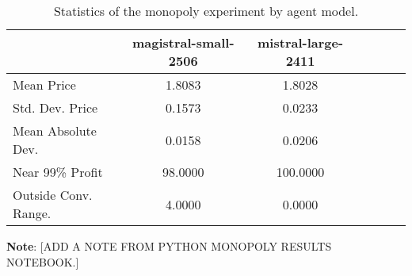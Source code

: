 \begin{table}[H]
\caption{Statistics of the monopoly experiment by agent model.}
\label{tab:monopoly_stats}
\begin{tabular}{lcccccc}
\toprule
 & magistral-small-2506 & mistral-large-2411 \\
\midrule
Mean Price & 1.8083 & 1.8028 \\
Std. Dev. Price & 0.1573 & 0.0233 \\
Mean Absolute Dev. & 0.0158 & 0.0206 \\
Near 99\% Profit & 98.0000 & 100.0000 \\
Outside Conv. Range. & 4.0000 & 0.0000 \\
\bottomrule
\end{tabular}
\vspace{0.5em}
\footnotesize{\parbox{1\textwidth}{\textbf{Note}: [ADD A NOTE FROM PYTHON MONOPOLY RESULTS NOTEBOOK.]}}

\end{table}
